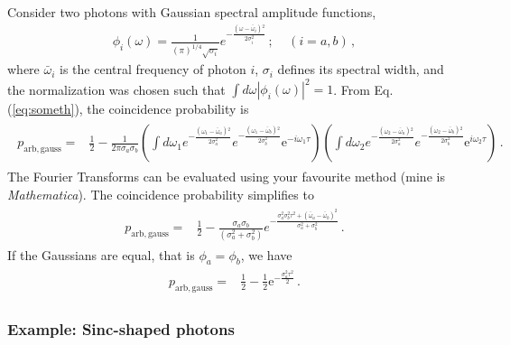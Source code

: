 \documentclass[12pt]{article}
\newcommand{\ee}[1] {\mathrm{e}^{#1}}
\begin{document}
Consider two photons with Gaussian spectral amplitude functions, 
\begin{align}
\phi_i(\omega)=\frac{1}{( \pi )^{1/4}\sqrt{   \sigma_i }}e^{-\frac{\left(\omega -\bar\omega_i\right){}^2}{2 \sigma_i^2}}\,; ~~~~~(i=a,b)\,,
\end{align} 
where $\bar\omega_i$ is the central frequency of photon $i$, $\sigma_i$ defines its spectral width,   and the normalization was chosen such that $\int d\omega |\phi_i(\omega)|^2=1$. From Eq. (\ref{eq:someth}), the coincidence probability is
\begin{align}
\begin{split}
p_{\mathrm{arb,gauss}}={}&\frac{1}{2}-\frac{1}{2\pi  \sigma_a\sigma_b }\left(\int d\omega_{1} e^{-\frac{\left(\omega_1 -\bar\omega_a\right){}^2}{2 \sigma_a^2}}e^{-\frac{\left(\omega_1 -\bar\omega_b\right){}^2}{2 \sigma_b^2}}\ee{-i\omega_{1} \tau}\right)\left(\int d\omega_{2}e^{-\frac{\left(\omega_2 -\bar\omega_a\right){}^2}{2 \sigma_a^2}}e^{-\frac{\left(\omega_2 -\bar\omega_b\right){}^2}{2 \sigma_b^2}} \ee{i\omega_2 \tau}\right)\,.
\end{split}
\end{align}
The Fourier Transforms can be evaluated using your favourite method (mine is \emph{Mathematica}). The coincidence probability simplifies to
\begin{align}
\begin{split}
p_{\mathrm{arb,gauss}}={}&\frac{1}{2}-\frac{\sigma_a\sigma_b }{ (\sigma_a^2+\sigma_b^2 )}e^{-\frac{\sigma_a^2\sigma_b^2\tau^2+(\bar\omega_a-\bar\omega_b)^2}{\sigma_a^2+\sigma_b^2}}\,.
\end{split}
\end{align}
If the Gaussians are equal, that is $\phi_a=\phi_b$, we have
\begin{align}\label{eq:dsgds}
\begin{split}
p_{\mathrm{arb,gauss}}={}&\frac{1}{2}-\frac{1}{2}\ee{- \frac{\sigma_a ^2 \tau^2}{2}}\,.
\end{split}
\end{align}

\subsubsection{Example: Sinc-shaped photons}
\end{document}
